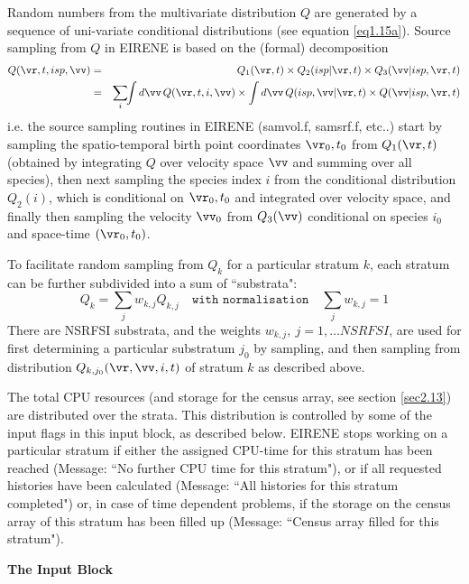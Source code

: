 Random numbers from the multivariate distribution $Q$ are
generated by a sequence of uni-variate conditional
distributions (see equation \ref{eq1.15a}).
Source sampling from $Q$ in EIRENE is based on
the (formal) decomposition
\begin{eqnarray}\label{samp-Q}
Q(\vr,t,isp,\vv) &=&   Q_1(\vr,t) \times Q_2(isp|\vr,t)
\times Q_3(\vv|isp,\vr,t) \nonumber \\
&=& \sum_i\!\!\int d\vv \,Q(\vr,t,i,\vv)
\times \int d\vv \,Q(isp,\vv|\vr,t)
\times Q(\vv |isp,\vr,t)
\end{eqnarray}
i.e. the source sampling routines in EIRENE
(samvol.f, samsrf.f, etc..)
start by sampling the spatio-temporal birth point
coordinates $\vr_0,t_0$
from $Q_1(\vr,t)$ (obtained by integrating $Q$ over velocity space $\vv$ and
summing over all species), then next sampling the species index $i$
from the conditional distribution $Q_2(i) $, which is conditional on $\vr_0,t_0$ and integrated over velocity space,
and finally then sampling the velocity $\vv_0$ from $Q_3(\vv)$ conditional on species $i_0$ and space-time $(\vr_0,t_0)$.


To facilitate random sampling from $Q_k$ for a particular stratum $k$, each stratum can be further subdivided into a sum of ``substrata":
\begin{equation}
Q_k= \sum_j w_{k,j} Q_{k,j}  \quad \texttt{with normalisation} \quad \sum_j  w_{k,j} = 1
\end{equation}
There are NSRFSI substrata, and the weights $w_{k,j}, \ j=1,\dots NSRFSI$, are used for first determining a particular
substratum $j_0$ by sampling, and then sampling from distribution $Q_{k,j_0}(\vr,\vv,i,t)$ of stratum $k$ as described above.

The total CPU resources (and storage for the census array, see
section \ref{sec2.13}) are distributed over the strata. This
distribution is controlled by some of the input flags in this
input block, as described below. EIRENE stops working on a
particular stratum if either the assigned CPU-time for this
stratum has been reached (Message: ``No further CPU time for this
stratum"), or if all requested histories have been calculated
(Message: ``All histories for this stratum completed") or, in case of
time dependent problems, if the
storage on the census array of this stratum has been filled up
(Message: ``Census array filled for this stratum").

\medskip

\noindent

{\bf The Input Block}

